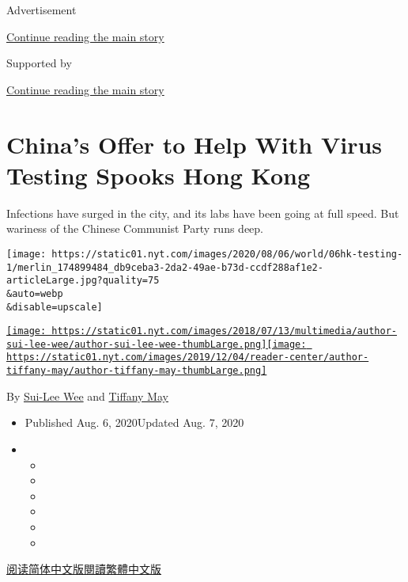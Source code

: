 Advertisement

\protect\hyperlink{after-top}{Continue reading the main story}

Supported by

\protect\hyperlink{after-sponsor}{Continue reading the main story}

\hypertarget{chinas-offer-to-help-with-virus-testing-spooks-hong-kong}{%
\section{China's Offer to Help With Virus Testing Spooks Hong
Kong}\label{chinas-offer-to-help-with-virus-testing-spooks-hong-kong}}

Infections have surged in the city, and its labs have been going at full
speed. But wariness of the Chinese Communist Party runs deep.

\texttt{[image: https://static01.nyt.com/images/2020/08/06/world/06hk-testing-1/merlin\_174899484\_db9ceba3-2da2-49ae-b73d-ccdf288af1e2-articleLarge.jpg?quality=75\\\&auto=webp\\\&disable=upscale]}

\href{https://www.nytimes.com/by/sui-lee-wee}{\texttt{[image: https://static01.nyt.com/images/2018/07/13/multimedia/author-sui-lee-wee/author-sui-lee-wee-thumbLarge.png]}}\href{https://www.nytimes.com/by/tiffany-may}{\texttt{[image: https://static01.nyt.com/images/2019/12/04/reader-center/author-tiffany-may/author-tiffany-may-thumbLarge.png]}}

By \href{https://www.nytimes.com/by/sui-lee-wee}{Sui-Lee Wee} and
\href{https://www.nytimes.com/by/tiffany-may}{Tiffany May}

\begin{itemize}
\item
  Published Aug. 6, 2020Updated Aug. 7, 2020
\item
  \begin{itemize}
  \item
  \item
  \item
  \item
  \item
  \item
  \end{itemize}
\end{itemize}

\href{https://cn.nytimes.com/china/20200807/hong-kong-china-coronavirus-testing/}{阅读简体中文版}\href{https://cn.nytimes.com/china/20200807/hong-kong-china-coronavirus-testing/zh-hant/}{閱讀繁體中文版}


